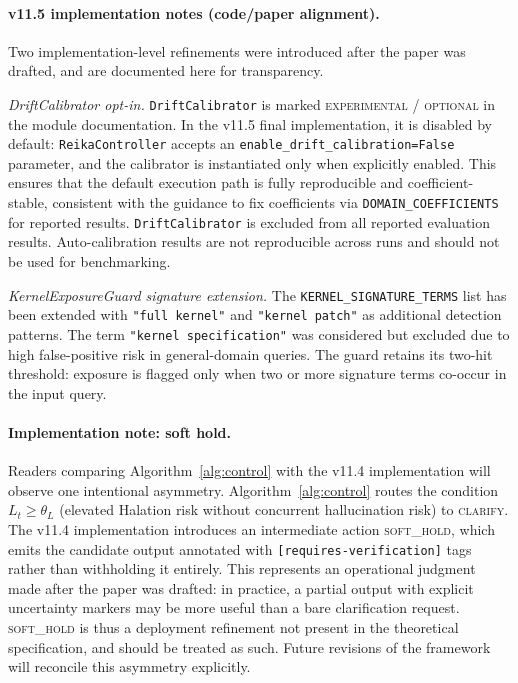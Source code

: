 \documentclass[11pt,a4paper]{article}
\begin{document}
\paragraph{v11.5 implementation notes (code/paper alignment).}
Two implementation-level refinements were introduced after the paper was drafted,
and are documented here for transparency.

\textit{DriftCalibrator opt-in.}
\texttt{DriftCalibrator} is marked \textsc{experimental / optional} in the module
documentation. In the v11.5 final implementation, it is disabled by default:
\texttt{ReikaController} accepts an \texttt{enable\_drift\_calibration=False}
parameter, and the calibrator is instantiated only when explicitly enabled.
This ensures that the default execution path is fully reproducible and
coefficient-stable, consistent with the guidance to fix coefficients via
\texttt{DOMAIN\_COEFFICIENTS} for reported results.
\texttt{DriftCalibrator} is excluded from all reported evaluation results.
Auto-calibration results are not reproducible across runs and should not be
used for benchmarking.

\textit{KernelExposureGuard signature extension.}
The \texttt{KERNEL\_SIGNATURE\_TERMS} list has been extended with
\texttt{"full kernel"} and \texttt{"kernel patch"} as additional detection
patterns. The term \texttt{"kernel specification"} was considered but excluded
due to high false-positive risk in general-domain queries.
The guard retains its two-hit threshold: exposure is flagged only when two or
more signature terms co-occur in the input query.

\paragraph{Implementation note: soft hold.}
\label{sec:softhold}
Readers comparing Algorithm~\ref{alg:control} with the v11.4 implementation
will observe one intentional asymmetry.
Algorithm~\ref{alg:control} routes the condition $L_t \geq \theta_L$
(elevated Halation risk without concurrent hallucination risk) to
\textsc{clarify}.
The v11.4 implementation introduces an intermediate action \textsc{soft\_hold},
which emits the candidate output annotated with \texttt{[requires-verification]}
tags rather than withholding it entirely.
This represents an operational judgment made after the paper was drafted:
in practice, a partial output with explicit uncertainty markers may be more
useful than a bare clarification request.
\textsc{soft\_hold} is thus a deployment refinement not present in the
theoretical specification, and should be treated as such.
Future revisions of the framework will reconcile this asymmetry explicitly.
\end{document}
